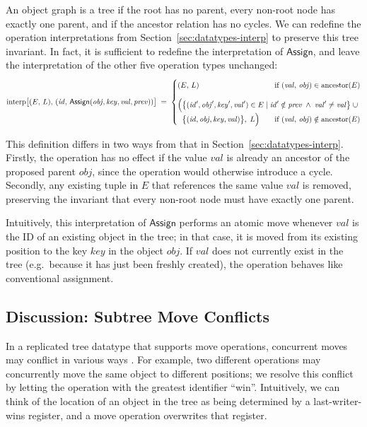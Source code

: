 An object graph is a tree if the root has no parent, every non-root node has exactly one parent, and if the ancestor relation has no cycles.
We can redefine the operation interpretations from Section~\ref{sec:datatypes-interp} to preserve this tree invariant.
In fact, it is sufficient to redefine the interpretation of $\mathsf{Assign}$, and leave the interpretation of the other five operation types unchanged:
\[
    \mathrm{interp}\big[(E,\, L),\, (\mathit{id},\, \mathsf{Assign}(\mathit{obj}, \mathit{key}, \mathit{val}, \mathit{prev})) \big] \;=\; \left\{
    \arraycolsep=0pt \def\arraystretch{1.5}
    \begin{array}{llllll}
        \multicolumn{2}{l}{(E,\, L)}
        & \text{if } (\mathit{val},\, \mathit{obj}) \in \mathrm{ancestor}(E) \\[8pt]
        \Big( & \multicolumn{2}{l}{
        \big\{ (\mathit{id}', \mathit{obj}', \mathit{key}', \mathit{val}') \in E \mid
        \mathit{id}' \notin \mathit{prev} \;\wedge\; \mathit{val}' \neq \mathit{val} \big\} \;\cup\;} \\
        & \big\{ (\mathit{id}, \mathit{obj}, \mathit{key}, \mathit{val}) \big\},\; L \Big) \qquad
        & \text{if } (\mathit{val},\, \mathit{obj}) \notin \mathrm{ancestor}(E)
    \end{array} \right.
\]

This definition differs in two ways from that in Section~\ref{sec:datatypes-interp}.
Firstly, the operation has no effect if the value $\mathit{val}$ is already an ancestor of the proposed parent $\mathit{obj}$, since the operation would otherwise introduce a cycle.
Secondly, any existing tuple in $E$ that references the same value $\mathit{val}$ is removed, preserving the invariant that every non-root node must have exactly one parent.

Intuitively, this interpretation of $\mathsf{Assign}$ performs an atomic move whenever $\mathit{val}$ is the ID of an existing object in the tree; in that case, it is moved from its existing position to the key $\mathit{key}$ in the object $\mathit{obj}$.
If $\mathit{val}$ does not currently exist in the tree (e.g.\ because it has just been freshly created), the operation behaves like conventional assignment.

\subsection{Discussion: Subtree Move Conflicts}

In a replicated tree datatype that supports move operations, concurrent moves may conflict in various ways \cite{Najafzadeh:2017vk,AhmedNacer:2012us,Tao:2015gd}.
For example, two different operations may concurrently move the same object to different positions; we resolve this conflict by letting the operation with the greatest identifier ``win''.
Intuitively, we can think of the location of an object in the tree as being determined by a last-writer-wins register, and a move operation overwrites that register.

